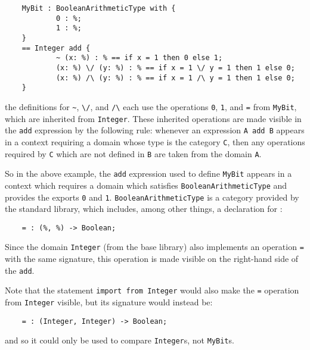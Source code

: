 {\begin{small}
\begin{verbatim}
    MyBit : BooleanArithmeticType with {
            0 : %;
            1 : %;
    }
    == Integer add {
            ~ (x: %) : % == if x = 1 then 0 else 1;
            (x: %) \/ (y: %) : % == if x = 1 \/ y = 1 then 1 else 0;
            (x: %) /\ (y: %) : % == if x = 1 /\ y = 1 then 1 else 0;
    }
\end{verbatim}
\end{small}

the definitions for \verb"~", \verb"\/", and \verb"/\" each use the operations
\verb"0", \verb"1", and \verb"=" from \verb"MyBit", which are inherited
from \verb"Integer".  These inherited operations are made visible in the
\verb"add" expression by the following rule:   whenever an
expression \verb"A add B" appears in a context requiring a domain whose
type is the category \verb"C", then any operations required by \verb"C"
which are not defined in \verb"B" are taken from the domain
\verb"A".

So in the above example, the \verb"add" expression used to define \verb"MyBit"
appears in a context which requires a domain which satisfies
\verb"BooleanArithmeticType" and provides the exports \verb"0" and \verb"1".
\verb"BooleanArithmeticType" is a category provided by the standard \asharp{} library, which
includes, among other things, a declaration for \ttin{=}:

\begin{small}
\begin{verbatim}
    = : (%, %) -> Boolean;
\end{verbatim}
\end{small}

Since the domain \verb"Integer" (from the base \asharp{} library) also
implements an operation \verb"=" with the same signature, this operation
is made visible on the right-hand side of the \verb"add".

Note that the statement \verb"import from Integer" would also make the
\verb"=" operation from \verb"Integer" visible, but its signature would
instead be:

\begin{small}
\begin{verbatim}
    = : (Integer, Integer) -> Boolean;
\end{verbatim}
\end{small}

and so it could only be used to compare \verb"Integer"s, not \verb"MyBit"s.

}
